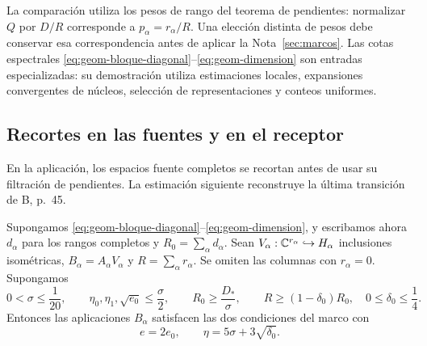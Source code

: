 La comparación utiliza los pesos de rango del teorema de
pendientes: normalizar $Q$ por $D/R$ corresponde a
$p_\alpha=r_\alpha/R$.
Una elección distinta de pesos debe conservar esa
correspondencia antes de aplicar la Nota~\ref{sec:marcos}.
Las cotas espectrales
\eqref{eq:geom-bloque-diagonal}--\eqref{eq:geom-dimension}
son entradas especializadas: su demostración utiliza
estimaciones locales, expansiones convergentes de núcleos,
selección de representaciones y conteos uniformes.

\subsection{Recortes en las fuentes y en el receptor}

En la aplicación, los espacios fuente completos se recortan
antes de usar su filtración de pendientes. La estimación siguiente
reconstruye la última transición de B, p.~45.

\begin{proposicion}
Supongamos \eqref{eq:geom-bloque-diagonal}--\eqref{eq:geom-dimension},
y escribamos ahora $d_\alpha$ para los rangos completos y
$R_0=\sum_\alpha d_\alpha$.
Sean $V_\alpha:\mathbb{C}^{r_\alpha}\hookrightarrow H_\alpha$
inclusiones isométricas, $B_\alpha=A_\alpha V_\alpha$ y
$R=\sum_\alpha r_\alpha$.
Se omiten las columnas con $r_\alpha=0$.
Supongamos
\[
 0<\sigma\le\frac1{20},\qquad
 \eta_0,\eta_1,\sqrt{e_0}\le\frac{\sigma}{2},\qquad
 R_0\ge\frac{D_*}{\sigma},\qquad
 R\ge(1-\delta_0)R_0,\quad 0\le\delta_0\le\frac14.
\]
Entonces las aplicaciones $B_\alpha$ satisfacen las dos
condiciones del marco con
\begin{equation}
              e=2e_0,\qquad \eta=5\sigma+3\sqrt{\delta_0}.
 \label{eq:geom-marco-recortado}
\end{equation}
\label{prop:geom-compresion}
\end{proposicion}

